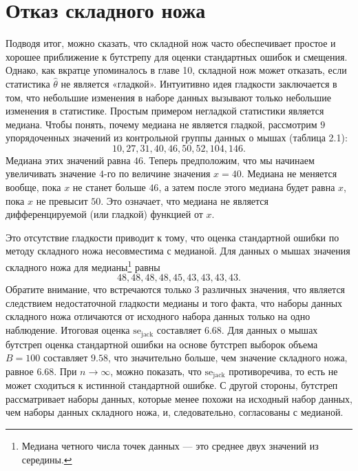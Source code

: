 \section{Отказ складного ножа}

Подводя итог, можно сказать, что складной нож часто обеспечивает простое и хорошее приближение к бутстрепу для оценки стандартных ошибок и смещения. Однако, как вкратце упоминалось в главе 10, складной нож может отказать, если статистика $\hat{\theta}$ не является «гладкой». Интуитивно идея гладкости заключается в том, что небольшие изменения в наборе данных вызывают только небольшие изменения в статистике. Простым примером негладкой статистики является медиана. Чтобы понять, почему медиана не является гладкой, рассмотрим $9$ упорядоченных значений из контрольной группы данных о мышах (таблица 2.1):
\begin{equation}\label{eq11.19}
    10,27,31,40,46,50,52,104,146.
\end{equation}
Медиана этих значений равна $46$. Теперь предположим, что мы начинаем увеличивать значение $4$-го по величине значения $x = 40$. Медиана не меняется вообще, пока $x$ не станет больше $46$, а затем после этого медиана будет равна $x$, пока $x$ не превысит $50$. Это означает, что медиана не является дифференцируемой (или гладкой) функцией от $x$.

Это отсутствие гладкости приводит к тому, что оценка стандартной ошибки по методу складного ножа несовместима с медианой. Для данных о мышах значения складного ножа для медианы\footnote{Медиана четного числа точек данных --- это среднее двух значений из середины.} равны
\begin{equation}\label{eq11.20}
    48,48,48,48,45,43,43,43,43.
\end{equation}
Обратите внимание, что встречаются только $3$ различных значения, что является следствием недостаточной гладкости медианы и того факта, что наборы данных складного ножа отличаются от исходного набора данных только на одно наблюдение. Итоговая оценка $\mathrm{se}_{\mathrm{jack}}$ составляет $6.68$. Для данных о мышах бутстреп оценка стандартной ошибки на основе бутстреп выборок объема $B = 100$ составляет $9.58$, что значительно больше, чем значение складного ножа, равное $6.68$. При $n \rightarrow \infty$, можно показать, что $\mathrm{se}_{\mathrm{jack}}$ противоречива, то есть не может сходиться к истинной стандартной ошибке. С другой стороны, бутстреп рассматривает наборы данных, которые менее похожи на исходный набор данных, чем наборы данных складного ножа, и, следовательно, согласованы с медианой. 